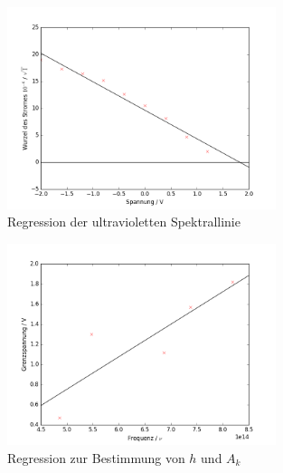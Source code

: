 \begin{figure}[h!]
	\centering
	\includegraphics[width=0.7\textwidth]{build/regression_Farbe:4.png}
	\caption{Regression der ultravioletten Spektrallinie}
	\label{fig:regression_uv}
\end{figure}

\begin{figure}[h!]
\centering
\includegraphics[width=0.7\textwidth]{build/regression_aufgabe2.png}
\caption{Regression zur Bestimmung von $h$ und $A_k$}
\label{fig:regression2}
\end{figure}


\clearpage

